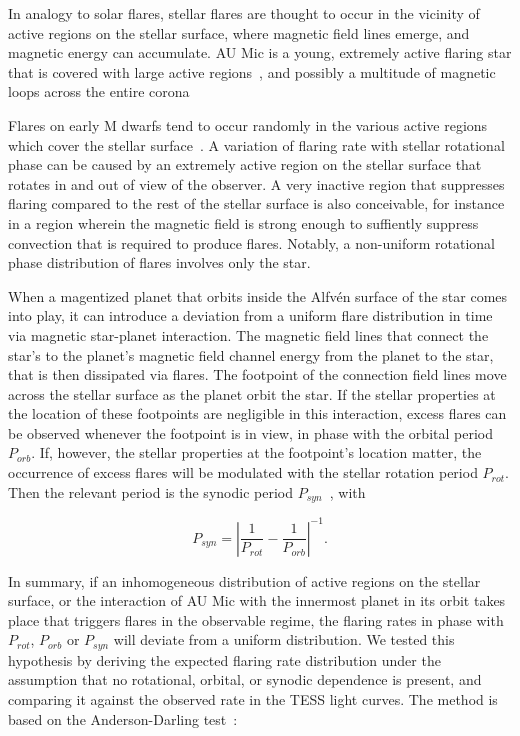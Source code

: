 \documentclass[fleqn,usenatbib,letters]{mnras}%
\begin{document}
In analogy to solar flares, stellar flares are thought to occur in the vicinity of active regions on the stellar surface, where magnetic field lines emerge, and magnetic energy can accumulate. AU Mic is a young, extremely active flaring star that is covered with large active regions~\citep{linsky1994, kochukhov2020, plavchan2020}, and possibly a multitude of magnetic loops across the entire corona~\citep{cranmer2013}



Flares on early M dwarfs tend to occur randomly in the various active regions which cover the stellar surface~\citep{doyle2018, doyle2019}. A variation of flaring rate with stellar rotational phase can be caused by an extremely active region on the stellar surface that rotates in and out of view of the observer. A very inactive region that suppresses flaring compared to the rest of the stellar surface is also conceivable, for instance in a region wherein the magnetic field is strong enough to suffiently suppress convection that is required to produce flares. Notably, a non-uniform rotational phase distribution of flares involves only the star. 

When a magentized planet that orbits inside the Alfv\'en surface of the star comes into play, it can introduce a deviation from a uniform flare distribution in time via magnetic star-planet interaction. The magnetic field lines that connect the star's to the planet's magnetic field channel energy from the planet to the star, that is then dissipated via flares. The footpoint of the connection field lines move across the stellar surface as the planet orbit the star. If the stellar properties at the location of these footpoints are negligible in this interaction, excess flares can be observed whenever the footpoint is in view, in phase with the orbital period $P_{orb}$. If, however, the stellar properties at the footpoint's location matter, the occurrence of excess flares will be modulated with the stellar rotation period $P_{rot}$. Then the relevant period is the synodic period $P_{syn}$~\citep{fischer2019}, with

\begin{equation}
P_{syn} = \left|\dfrac{1}{P_{rot}} - \dfrac{1}{P_{orb}}\right|^{-1}.
\end{equation}

In summary, if an inhomogeneous distribution of active regions on the stellar surface, or the interaction of AU Mic with the innermost planet in its orbit takes place that triggers flares in the observable regime, the flaring rates in phase with $P_{rot}$, $P_{orb}$ or $P_{syn}$  will deviate from a uniform distribution. We tested this hypothesis by deriving the expected flaring rate distribution under the assumption that no rotational, orbital, or synodic dependence is present, and comparing it against the observed rate in the TESS light curves. The method is based on the Anderson-Darling test~\citep{anderson1952, stephens2006}:
\end{document}
